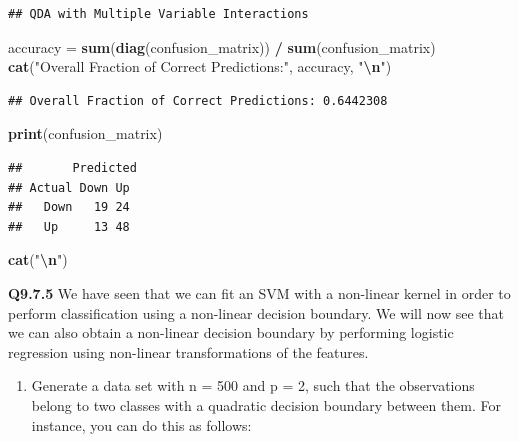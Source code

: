 \documentclass[
]{article}
\newenvironment{Shaded}{\begin{snugshade}}{\end{snugshade}}
\newcommand{\FunctionTok}[1]{\textcolor[rgb]{0.13,0.29,0.53}{\textbf{#1}}}
\newcommand{\NormalTok}[1]{#1}
\newcommand{\OtherTok}[1]{\textcolor[rgb]{0.56,0.35,0.01}{#1}}
\newcommand{\SpecialCharTok}[1]{\textcolor[rgb]{0.81,0.36,0.00}{\textbf{#1}}}
\newcommand{\StringTok}[1]{\textcolor[rgb]{0.31,0.60,0.02}{#1}}
\providecommand{\tightlist}{%
  \setlength{\itemsep}{0pt}\setlength{\parskip}{0pt}}
\begin{document}
\begin{verbatim}
## QDA with Multiple Variable Interactions
\end{verbatim}

\begin{Shaded}
\begin{Highlighting}[]
\NormalTok{accuracy }\OtherTok{=} \FunctionTok{sum}\NormalTok{(}\FunctionTok{diag}\NormalTok{(confusion\_matrix)) }\SpecialCharTok{/} \FunctionTok{sum}\NormalTok{(confusion\_matrix)}
\FunctionTok{cat}\NormalTok{(}\StringTok{"Overall Fraction of Correct Predictions:"}\NormalTok{, accuracy, }\StringTok{"}\SpecialCharTok{\textbackslash{}n}\StringTok{"}\NormalTok{)}
\end{Highlighting}
\end{Shaded}

\begin{verbatim}
## Overall Fraction of Correct Predictions: 0.6442308
\end{verbatim}

\begin{Shaded}
\begin{Highlighting}[]
\FunctionTok{print}\NormalTok{(confusion\_matrix)}
\end{Highlighting}
\end{Shaded}

\begin{verbatim}
##       Predicted
## Actual Down Up
##   Down   19 24
##   Up     13 48
\end{verbatim}

\begin{Shaded}
\begin{Highlighting}[]
\FunctionTok{cat}\NormalTok{(}\StringTok{"}\SpecialCharTok{\textbackslash{}n}\StringTok{"}\NormalTok{)}
\end{Highlighting}
\end{Shaded}

\textbf{Q9.7.5} We have seen that we can fit an SVM with a non-linear
kernel in order to perform classification using a non-linear decision
boundary. We will now see that we can also obtain a non-linear decision
boundary by performing logistic regression using non-linear
transformations of the features.

\begin{enumerate}
\def\labelenumi{(\alph{enumi})}
\tightlist
\item
  Generate a data set with n = 500 and p = 2, such that the observations
  belong to two classes with a quadratic decision boundary between them.
  For instance, you can do this as follows:
\end{enumerate}
\end{document}
